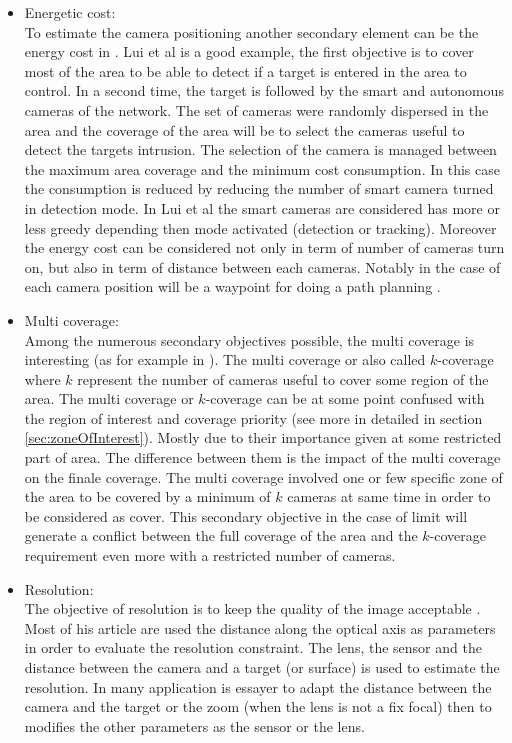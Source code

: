 \begin{itemize}
\item  Energetic cost:
\\ To estimate the camera positioning another secondary element can be the energy cost in \cite{38*liu2010,42*bulusu2001}. Lui et al \cite{38*liu2010} is a good example, the first objective is to cover most of the area to be able to detect if a target is entered in the area to control. In a second time, the target is followed by  the smart and autonomous cameras of the network. The set of cameras were randomly dispersed in the area and the coverage of the area will be to select the cameras useful to detect the targets intrusion. The selection of the camera is managed between the maximum area coverage and the minimum cost consumption. In this case the consumption is reduced by reducing the number of smart camera turned in detection mode. In Lui et al \cite{38*liu2010} the smart cameras are considered has more or less greedy depending then mode activated (detection or tracking). Moreover the energy cost can be considered not only in term of number of cameras turn on, but also in term of distance between each cameras. Notably in the case of each camera position will be a waypoint for doing a path planning \cite{191*di2016,218*meiting2007}.  
\\
\item Multi coverage:\\ Among the numerous secondary objectives possible, the multi coverage is interesting (as for example in \cite{149*mavrinac2013,151*zhao2013,152*wang2009,174*zhang2016,175*medhi2013}). The multi coverage or also called $k$-coverage where $k$ represent the number of cameras useful to cover some region of the area. The multi coverage or $k$-coverage can be at some point confused with the region of interest and coverage priority (see more in detailed in section \ref{sec:zoneOfInterest}). Mostly due to their importance given at some restricted part of area. The difference between them is the impact of the multi coverage on the finale coverage. The multi coverage involved one or few specific zone of the area to be covered by a minimum of $k$ cameras at same time in order to be considered as cover. This secondary objective in the case of limit will generate a conflict between the full coverage of the area and the $k$-coverage requirement even more with a restricted number of cameras. 
\\ 
\item  Resolution:\\ The objective of resolution is to keep the quality of the image acceptable \cite{27*bodor2005,33*reddy2012,171*horster2006,152*wang2009,43*erdem2006}. Most of his article are used the distance along the optical axis as parameters in order to evaluate the resolution constraint. The lens, the sensor and the distance between the camera  and a target (or surface) is used to estimate the resolution. In many application is essayer to adapt the distance between the camera and the target or the zoom (when the lens is not a fix focal) then to modifies the other parameters as the sensor or the lens.\\

\end{itemize}
